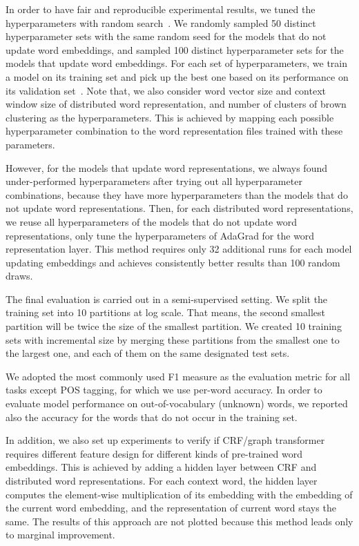 In order to have fair and reproducible experimental results, we tuned the hyperparameters with random search~\cite{bergstra2012random}. 
We randomly sampled 50 distinct hyperparameter sets with the same random seed for the models that do not update word embeddings, and sampled 100 distinct hyperparameter sets for the models that update word embeddings. 
For each set of hyperparameters, we train a model on its training set and pick up the best one based on its performance on its validation set~\cite{turian2010word}. 
Note that, we also consider word vector size and context window size of distributed word representation, and number of clusters of brown clustering as the hyperparameters.
This is achieved by mapping each possible hyperparameter combination to the word representation files trained with these parameters. 

However, for the models that update word representations, we always found under-performed hyperparameters after trying out all hyperparameter combinations, because they have more hyperparameters than the models that do not update word representations. Then, for each distributed word representations, we reuse all hyperparameters of the models that do not update word representations, only tune the hyperparameters of AdaGrad for the word representation layer. This method requires only 32 additional runs for each model updating embeddings and achieves consistently better results than 100 random draws.

The final evaluation is carried out in a semi-supervised setting. We split the training set into 10 partitions at log scale. That means, the second smallest partition will be twice the size of the smallest partition. We created 10 training sets with incremental size by merging these partitions from the smallest one to the largest one, and each of them on the same designated test sets. 

We adopted the most commonly used F1 measure as the evaluation metric for all tasks except POS tagging, for which we use per-word accuracy. In order to evaluate model performance on out-of-vocabulary (unknown) words, we reported also the accuracy for the words that do not occur in the training set.

In addition, we also set up experiments to verify if CRF/graph transformer requires different feature design for different kinds of pre-trained word embeddings. This is achieved by adding a hidden layer between CRF and distributed word representations. For each context word, the hidden layer computes the element-wise multiplication of its embedding with the embedding of the current word embedding, and the representation of current word stays the same. The results of this approach are not plotted because this method leads only to marginal improvement.

